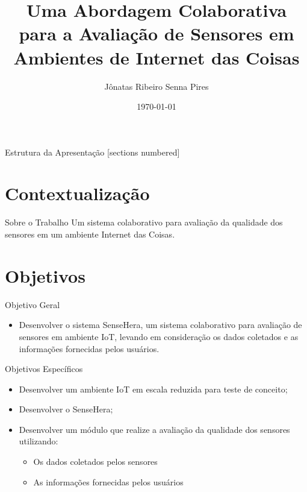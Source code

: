 \documentclass{beamer}
\title{Uma Abordagem Colaborativa para a Avaliação de Sensores em Ambientes de Internet das Coisas}
\date{\today}
\author{Jônatas Ribeiro Senna Pires}
\institute{Universidade de Brasília}
\begin{document}
  \maketitle

  \begin{frame}{Estrutura da Apresentação}
    [sections numbered]
    \tableofcontents[hideallsubsections]
  \end{frame}

  \section{Contextualização}
    \begin{frame}{Sobre o Trabalho}
      Um sistema colaborativo para avaliação \cite{collaborative} da qualidade dos sensores em um ambiente Internet das Coisas.
    \end{frame}

  \section{Objetivos}
    \begin{frame}{Objetivo Geral}
          \begin{itemize}
            \item Desenvolver o sistema SenseHera, um sistema colaborativo para avaliação de sensores em ambiente IoT, levando em consideração os dados coletados e as informações fornecidas pelos usuários.
          \end{itemize}
    \end{frame}

    \begin{frame}{Objetivos Específicos}
      \begin{itemize}
          \item Desenvolver um ambiente IoT em escala reduzida para teste de conceito;
          \item Desenvolver o SenseHera;
          \item Desenvolver um módulo que realize a avaliação da qualidade dos sensores utilizando:
            \begin{itemize}
              \item Os dados coletados pelos sensores
              \item As informações fornecidas pelos usuários
            \end{itemize}
      \end{itemize}
    \end{frame}
\end{document}

